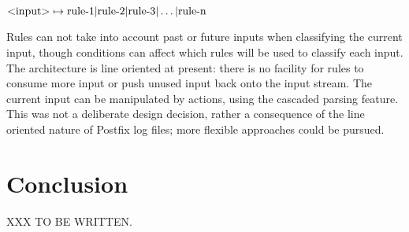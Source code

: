 $\text{\textless{}input\textgreater{}} \mapsto{} \text{rule-1} |
\text{rule-2} | \text{rule-3} | \dots | \text{rule-n}$

Rules can not take into account past or future inputs when classifying the
current input, though conditions can affect which rules will be used to
classify each input.  The architecture is line oriented at present: there
is no facility for rules to consume more input or push unused input back
onto the input stream.  The current input can be manipulated by actions,
using the cascaded parsing feature.  This was not a deliberate design
decision, rather a consequence of the line oriented nature of Postfix log
files; more flexible approaches could be pursued.

\section{Conclusion}

XXX TO BE WRITTEN\@.
